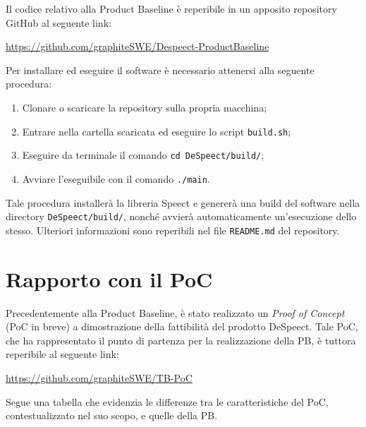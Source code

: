 \documentclass[openany,12pt,a4paper]{report}
\begin{document}
	Il codice relativo alla Product Baseline è reperibile in un apposito repository GitHub al seguente link:
	\begin{center}
		\url{https://github.com/graphiteSWE/Despeect-ProductBaseline}
	\end{center} 

	\noindent Per installare ed eseguire il software è necessario attenersi alla seguente procedura:
	\begin{enumerate}
		\item Clonare o scaricare la repository sulla propria macchina;
		\item Entrare nella cartella scaricata ed eseguire lo script \verb|build.sh|;
		\item Eseguire da terminale il comando \verb|cd DeSpeect/build/|;
		\item Avviare l'eseguibile con il comando \verb|./main|.
	\end{enumerate}
	Tale procedura installerà la libreria Speect e genererà una build del software nella directory \verb|DeSpeect/build/|, nonché avvierà automaticamente un'esecuzione dello stesso. Ulteriori informazioni sono reperibili nel file \verb|README.md| del repository.

	\chapter{Rapporto con il PoC}
	Precedentemente alla Product Baseline, è stato realizzato un \textit{Proof of Concept} (PoC in breve) a dimostrazione della fattibilità del prodotto DeSpeect. Tale PoC, che ha rappresentato il punto di partenza per la realizzazione della PB, è tuttora reperibile al seguente link:
	\begin{center}
		\url{https://github.com/graphiteSWE/TB-PoC}
	\end{center}

	\noindent Segue una tabella che evidenzia le differenze tra le caratteristiche del PoC, contestualizzato nel suo scopo, e quelle della PB. \\
	
\end{document}

